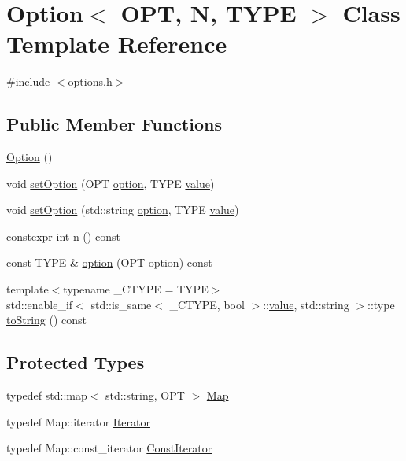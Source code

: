 \hypertarget{class_option}{}\section{Option$<$ O\+PT, N, T\+Y\+PE $>$ Class Template Reference}
\label{class_option}


{\ttfamily \#include $<$options.\+h$>$}

\subsection*{Public Member Functions}
\begin{DoxyCompactItemize}
\item 
\mbox{\hyperlink{class_option_ae37ce433cfe6b424ad7c83ade2a944a1}{Option}} ()
\item 
void \mbox{\hyperlink{class_option_a1b2d388b3af25fe8e71e595f2b016d43}{set\+Option}} (O\+PT \mbox{\hyperlink{class_option_ab934f091ca5f7f68ce17fb063156df21}{option}}, T\+Y\+PE \mbox{\hyperlink{diffusion_8cpp_a4b41795815d9f3d03abfc739e666d5da}{value}})
\item 
void \mbox{\hyperlink{class_option_aa966ec4ce23f24333ea6fa4985d48730}{set\+Option}} (std\+::string \mbox{\hyperlink{class_option_ab934f091ca5f7f68ce17fb063156df21}{option}}, T\+Y\+PE \mbox{\hyperlink{diffusion_8cpp_a4b41795815d9f3d03abfc739e666d5da}{value}})
\item 
constexpr int \mbox{\hyperlink{class_option_abe20a0d528e8865dcb52a788ee4f161f}{n}} () const
\item 
const T\+Y\+PE \& \mbox{\hyperlink{class_option_ab934f091ca5f7f68ce17fb063156df21}{option}} (O\+PT option) const
\item 
{\footnotesize template$<$typename \+\_\+\+C\+T\+Y\+PE  = T\+Y\+PE$>$ }\\std\+::enable\+\_\+if$<$ std\+::is\+\_\+same$<$ \+\_\+\+C\+T\+Y\+PE, bool $>$\+::\mbox{\hyperlink{diffusion_8cpp_a4b41795815d9f3d03abfc739e666d5da}{value}}, std\+::string $>$\+::type \mbox{\hyperlink{class_option_a506d0709a13394ec25e0a51e182604dd}{to\+String}} () const
\end{DoxyCompactItemize}
\subsection*{Protected Types}
\begin{DoxyCompactItemize}
\item 
typedef std\+::map$<$ std\+::string, O\+PT $>$ \mbox{\hyperlink{class_option_a4a16877e4cb71dc27ceb30aee15537c2}{Map}}
\item 
typedef Map\+::iterator \mbox{\hyperlink{class_option_a04dc85c3f4d2672befc47c9f87f2af7d}{Iterator}}
\item 
typedef Map\+::const\+\_\+iterator \mbox{\hyperlink{class_option_aaac736165c4115b84b0b857d48c3a61f}{Const\+Iterator}}
\end{DoxyCompactItemize}
